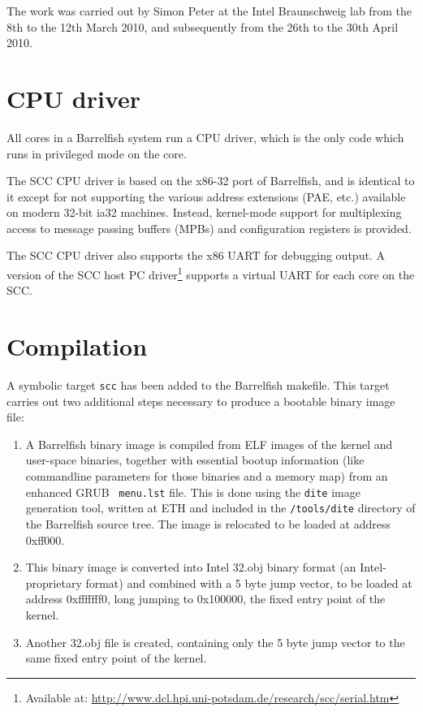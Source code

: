 \documentclass[a4paper,twoside]{report} %
\begin{document}
The work was carried out by Simon Peter at the Intel Braunschweig lab
from the 8th to the 12th March 2010, and subsequently from the 26th to
the 30th April 2010. 

\section{CPU driver}

All cores in a Barrelfish system run a CPU driver, which is the only
code which runs in privileged mode on the core.  

The SCC CPU driver is based on the x86-32 port of Barrelfish, and is
identical to it except for not supporting the various address
extensions (PAE, etc.) available on modern 32-bit ia32
machines. Instead, kernel-mode support for multiplexing access to
message passing buffers (MPBs) and configuration registers is
provided.

The SCC CPU driver also supports the x86 UART for debugging output. A
version of the SCC host PC driver\footnote{Available at:
  \url{http://www.dcl.hpi.uni-potsdam.de/research/scc/serial.htm}}
supports a virtual UART for each core on the SCC.

\section{Compilation}

A symbolic target \texttt{scc} has been added to the Barrelfish
makefile. This target carries out two additional steps necessary to
produce a bootable binary image file:

\begin{enumerate}
\item A Barrelfish binary image is compiled from ELF images of the
  kernel and user-space binaries, together with essential bootup
  information (like commandline parameters for those binaries and a
  memory map) from an enhanced GRUB~\cite{grub} \texttt{menu.lst}
  file. This is done using the \texttt{dite} image generation tool,
  written at ETH and included in the \texttt{/tools/dite} directory of
  the Barrelfish source tree. The image is relocated to be loaded at
  address 0xff000.

\item This binary image is converted into Intel 32.obj binary format
  (an Intel-proprietary format) and combined with a 5 byte jump
  vector, to be loaded at address 0xfffffff0, long jumping to
  0x100000, the fixed entry point of the kernel.

\item Another 32.obj file is created, containing only the 5 byte jump
  vector to the same fixed entry point of the kernel.
\end{enumerate}
\end{document}
